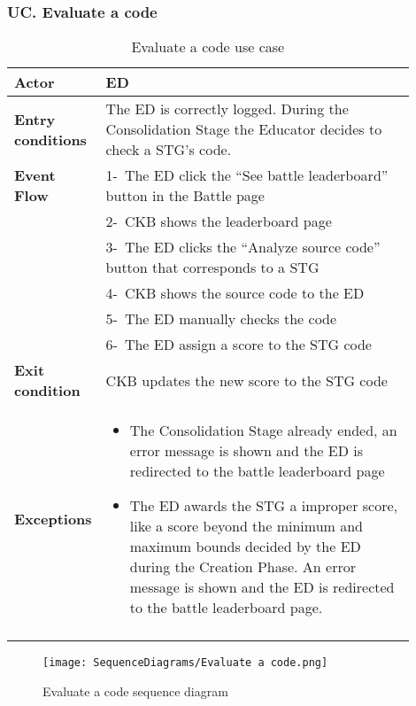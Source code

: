 \subsubsection*{UC\cuc . Evaluate a code}
\begin{center}
    \begin{longtable}{|l|p{0.9\linewidth}|}
        \hline
        \textbf{Actor}            & ED                                                                                                                                                                                        \\
        \hline
        \textbf{Entry conditions} & The ED is correctly logged. During the Consolidation Stage the Educator decides to check a STG’s code.        \\
        \hline
        \textbf{Event Flow}       & 1-\  The ED click the “See battle leaderboard” button in the Battle page      \\
        & 2-\   CKB shows the leaderboard page     \\
        & 3-\   The ED clicks the “Analyze source code” button that corresponds to a STG     \\
        & 4-\   CKB shows the source code to the ED     \\
        & 5-\   The ED manually checks the code     \\
        & 6-\   The ED assign a score to the STG code     \\
        \hline
        \textbf{Exit condition}   & CKB updates the new score to the STG code       \\
        \hline
        \textbf{Exceptions}        & \begin{itemize}
            \item The Consolidation Stage already ended, an error message is shown and the ED is redirected to the battle leaderboard page
            \item The ED awards the STG a improper score, like a score beyond the minimum and maximum bounds decided by the ED during the Creation Phase. An error message is shown and the ED is redirected to the battle leaderboard page.
         \end{itemize}    \\
        \hline
        \caption{Evaluate a code use case}
        \label{tab: evaluate_a_code_use_case}
    \end{longtable}
\end{center}


\begin{figure}[H]
    \begin{center}
        \texttt{[image: SequenceDiagrams/Evaluate a code.png]}
        \caption{Evaluate a code sequence diagram}
        \label{fig:evaluate_a_code_seqd}%
    \end{center}
\end{figure}

